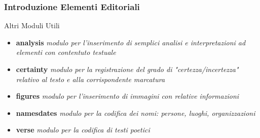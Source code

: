 \documentclass{beamer}
\begin{document}
    \begin{frame}
        \frametitle{Introduzione Elementi Editoriali}
        \addtocounter{nframe}{1}
        
        \begin{block}{Altri Moduli Utili}
           \begin{itemize}
               \item \textbf{analysis} \textit{modulo per l'inserimento di semplici analisi e interpretazioni ad elementi con contentuto testuale}
               \item \textbf{certainty} \textit{modulo per la registrazione del grado di "certezza/incertezza" relativo al testo e alla corrispondente marcatura}
               \item \textbf{figures} \textit{modulo per l'inserimento di immagini con relative informazioni}
               \item \textbf{namesdates} \textit{modulo per la codifica dei nomi: persone, luoghi, organizzazioni}
               \item \textbf{verse} \textit{modulo per la codifica di testi poetici}
           \end{itemize}
        \end{block}
        
    \end{frame}
    
        
    
            
        
\end{document}
